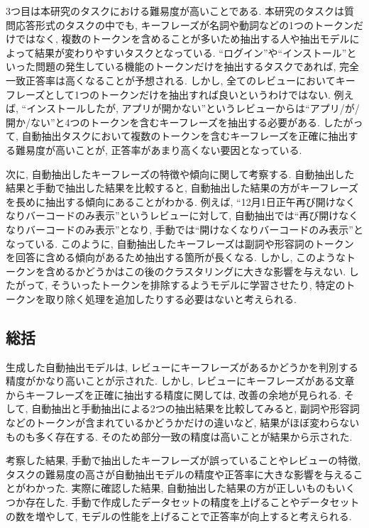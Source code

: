 3つ目は本研究のタスクにおける難易度が高いことである. 本研究のタスクは質問応答形式のタスクの中でも, キーフレーズが名詞や動詞などの1つのトークンだけではなく, 複数のトークンを含めることが多いため抽出する人や抽出モデルによって結果が変わりやすいタスクとなっている. 
``ログイン''や``インストール''といった問題の発生している機能のトークンだけを抽出するタスクであれば, 完全一致正答率は高くなることが予想される. しかし, 全てのレビューにおいてキーフレーズとして1つのトークンだけを抽出すれば良いというわけではない. 
例えば, ``インストールしたが, アプリが開かない''というレビューからは``アプリ/が/開か/ない''と4つのトークンを含むキーフレーズを抽出する必要がある. 
したがって, 自動抽出タスクにおいて複数のトークンを含むキーフレーズを正確に抽出する難易度が高いことが, 正答率があまり高くない要因となっている. 

次に, 自動抽出したキーフレーズの特徴や傾向に関して考察する. 
自動抽出した結果と手動で抽出した結果を比較すると, 自動抽出した結果の方がキーフレーズを長めに抽出する傾向にあることがわかる. 
例えば, ``12月1日正午再び開けなくなりバーコードのみ表示''というレビューに対して, 自動抽出では``再び開けなくなりバーコードのみ表示''となり, 手動では``開けなくなりバーコードのみ表示''となっている. 
このように, 自動抽出したキーフレーズは副詞や形容詞のトークンを回答に含める傾向があるため抽出する箇所が長くなる. しかし, このようなトークンを含めるかどうかはこの後のクラスタリングに大きな影響を与えない. したがって, そういったトークンを排除するようモデルに学習させたり, 特定のトークンを取り除く処理を追加したりする必要はないと考えられる. 


\subsection{総括}
生成した自動抽出モデルは, レビューにキーフレーズがあるかどうかを判別する精度がかなり高いことが示された. 
しかし, レビューにキーフレーズがある文章からキーフレーズを正確に抽出する精度に関しては, 改善の余地が見られる. そして, 自動抽出と手動抽出による2つの抽出結果を比較してみると, 副詞や形容詞などのトークンが含まれているかどうかだけの違いなど, 結果がほぼ変わらないものも多く存在する. そのため部分一致の精度は高いことが結果から示された. 

考察した結果, 手動で抽出したキーフレーズが誤っていることやレビューの特徴, タスクの難易度の高さが自動抽出モデルの精度や正答率に大きな影響を与えることがわかった. 実際に確認した結果, 自動抽出した結果の方が正しいものもいくつか存在した. 
手動で作成したデータセットの精度を上げることやデータセットの数を増やして, モデルの性能を上げることで正答率が向上すると考えられる. 

